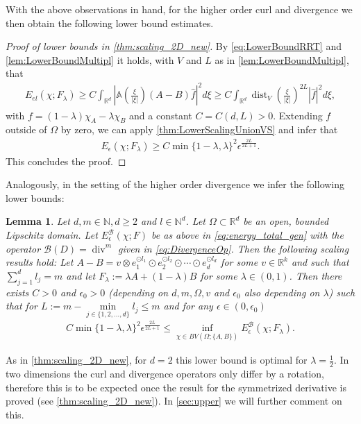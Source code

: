 \documentclass[a4paper, 10pt, twoside, notitlepage]{amsart}
\theoremstyle{plain}
\newtheorem{lem}[prop]{Lemma}
\newcommand{\R}{\mathbb{R}}
\newcommand{\N}{\mathbb{N}}
\newcommand{\B}{\mathcal{B}}
\renewcommand{\AA}{\mathbb{A}}
\DeclareMathOperator{\di}{div}
\DeclareMathOperator{\dist}{dist}
\begin{document}
		With the above observations in hand, for the higher order curl and divergence we then obtain the following lower bound estimates.
                
			\begin{proof}[Proof of lower bounds in \cref{thm:scaling_2D_new}]
				By \cref{eq:LowerBoundRRT} and \cref{lem:LowerBoundMultipl} it holds, with $V$ and $L$ as in \cref{lem:LowerBoundMultipl}, that
				\begin{align*}
					E_{el}(\chi;F_\lambda) \geq C \int_{\R^d} |\AA(\frac{\xi}{|\xi|})(A-B) \hat{f}|^2 d\xi \geq C \int_{\R^d} \dist_V(\frac{\xi}{|\xi|})^{2L} |\hat{f}|^2 d\xi,
				\end{align*}
				with $f = (1-\lambda)\chi_A-\lambda\chi_B$ and a constant $C = C(d,L)>0$.  Extending $f$ outside of $\Omega$ by zero, we can apply \cref{thm:LowerScalingUnionVS} and infer that
				\begin{align*}
					E_{\epsilon}(\chi;F_\lambda) \geq C\min\{1-\lambda,\lambda\}^2 \epsilon^{\frac{2L}{2L+1}}.
				\end{align*}
				This concludes the proof.
			\end{proof}
		
		
		Analogously, in the setting of the higher order divergence we infer the following lower bounds:
		
                            
             \begin{lem}
            \label{lem:LowerScalingDiv}
		Let $d,m \in \N, d \geq 2$ and $l \in \N^d$. Let $\Omega \subset \R^d$ be an open, bounded Lipschitz domain. Let $E_{\epsilon}^{\mathcal{B}}(\chi;F)$ be as above in \cref{eq:energy_total_gen}  with the operator $\B(D) = \di^m$ given in \cref{eq:DivergenceOp}. Then the following scaling results hold:
                Let $A-B = v \otimes e_1^{\odot l_1} \odot e_2^{\odot l_2} \odot \cdots \odot e_d^{\odot l_d}$ for some $v \in \R^k$ and such
			that $\sum_{j = 1}^{d} l_{j} = m$ and let $F_{\lambda}:= \lambda A + (1-\lambda ) B$ for some $\lambda \in (0,1)$. Then there exists $C>0$ and $\epsilon_0>0$ (depending on $d, m, \Omega, v$ and $\epsilon_0$ also depending on $\lambda$) such
			that for $L:=m -\min\limits_{j\in\{1,2,\dots,d\}}l_j \leq m$ and for any $\epsilon \in (0,\epsilon_0)$
			\begin{align*}
				C \min\{1-\lambda,\lambda\}^2 \epsilon^{\frac{2L}{2L+1}} \leq \inf\limits_{\chi \in BV(\Omega;\{A,B\})} E_{\epsilon}^{\mathcal{B}}(\chi; F_{\lambda}) .
			\end{align*}
                      \end{lem}
                    As in \cref{thm:scaling_2D_new}, for $d = 2$ this lower bound is optimal for $\lambda = \frac{1}{2}$. In two dimensions the curl and divergence operators only differ by a rotation, therefore this is to be expected once the result for the symmetrized derivative is proved (see \cref{thm:scaling_2D_new}). In \cref{sec:upper} we will further comment on this.
                    
\end{document}
